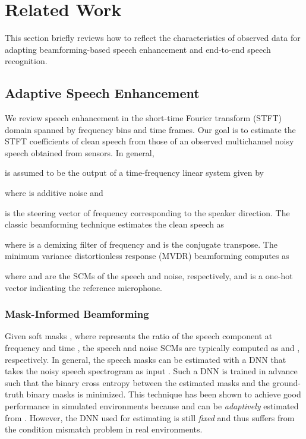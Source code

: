 \documentclass[a4paper]{article}
\begin{document}
\section{Related Work}
\label{sec:related_work}
This section briefly reviews
 how to reflect the characteristics of observed data
 for adapting beamforming-based speech enhancement
 and end-to-end speech recognition.

\subsection{Adaptive Speech Enhancement}
\label{sec:conventional_beamformer}

We review speech enhancement in the short-time Fourier transform (STFT) domain
 spanned by  frequency bins and  time frames.
Our goal is to estimate 
 the STFT coefficients of clean speech 
 from those of an observed multichannel noisy speech 
  obtained from  sensors.
In general, 
  
 is assumed to be the output of a time-frequency linear system given by

where
 is additive noise and

 is the steering vector of frequency 
 corresponding to the speaker direction.
The classic beamforming technique
 estimates the clean speech as

where  is a demixing filter of frequency 
 and  is the conjugate transpose.
The
 minimum variance distortionless response (MVDR) beamforming \cite{souden_optimal_2010}
 computes  as

where
  and 
  are the SCMs of the speech and noise, respectively,
 and  is a one-hot vector 
 indicating the reference microphone.

\subsubsection{Mask-Informed Beamforming}

Given soft masks ,
 where  represents the ratio of the speech component
 at frequency  and time , 
 the speech and noise SCMs are typically computed as
 and
, respectively.
In general, 
 the speech masks  can be estimated 
 with a DNN that takes the noisy speech spectrogram  as input
 \cite{heymann_neural_2016,erdogan_improved_2016}.
Such a DNN is trained in advance such that the binary cross entropy 
 between the estimated masks  and
 the ground-truth binary masks 
 is minimized.
This technique has been shown to achieve good performance
 in simulated environments
 because  and  can be \textit{adaptively} estimated from .
However,
 the DNN used for estimating  is still \textit{fixed}
 and thus suffers from the condition mismatch problem
 in real environments.
\end{document}
